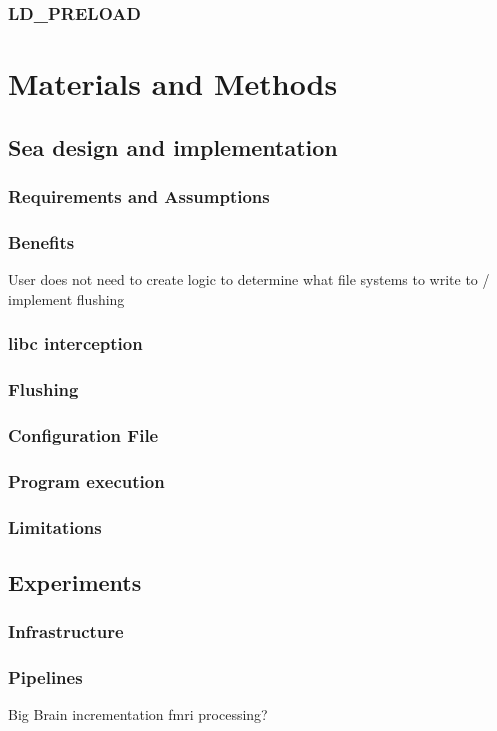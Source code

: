 \documentclass[10pt,journal,compsoc]{IEEEtran}
\begin{document}
\subsubsection{LD\_PRELOAD}

\section{Materials and Methods}

\subsection{Sea design and implementation}
\subsubsection{Requirements and Assumptions}
\subsubsection{Benefits}
User does not need to create logic to determine what file systems to write to / implement flushing

\subsubsection{libc interception}
\subsubsection{Flushing}
\subsubsection{Configuration File}
\subsubsection{Program execution}
\subsubsection{Limitations}

\subsection{Experiments}
\subsubsection{Infrastructure}
\subsubsection{Pipelines}
Big Brain incrementation
fmri processing?
\end{document}
